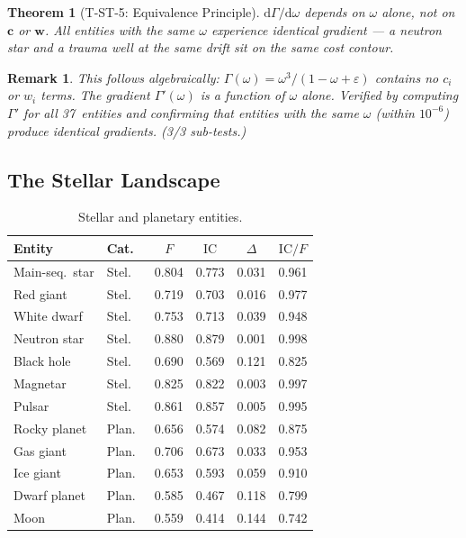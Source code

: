 \documentclass[
  aps,
  prd,
  twocolumn,
  superscriptaddress,
  nofootinbib,
  floatfix
]{revtex4-2}
\newtheorem{theorem}{Theorem}
\newtheorem{remark}{Remark}
\newcommand{\Gam}{\Gamma}
\newcommand{\eps}{\varepsilon}
\newcommand{\dd}{\mathrm{d}}
\newcommand{\tvec}{\mathbf{c}}
\newcommand{\wvec}{\mathbf{w}}
\newcommand{\IC}{\mathrm{IC}}
\begin{document}
\begin{theorem}[T-ST-5: Equivalence Principle]\label{thm:T5}
$\dd\Gam/\dd\omega$ depends on $\omega$ alone, not on
$\tvec$ or $\wvec$.  All entities with the same $\omega$
experience identical gradient --- a neutron star and a
trauma well at the same drift sit on the same cost contour.
\end{theorem}

\begin{remark}
This follows algebraically: $\Gam(\omega) = \omega^3/
(1 - \omega + \eps)$ contains no $c_i$ or $w_i$
terms.  The gradient $\Gam'(\omega)$ is a function of
$\omega$ alone.  Verified by computing $\Gam'$ for all
37~entities and confirming that entities with the same
$\omega$ (within $10^{-6}$) produce identical gradients.
(3/3 sub-tests.)
\end{remark}

\subsection{The Stellar Landscape}

\begin{table}[htbp]
\caption{\label{tab:stellar}Stellar and planetary entities.}
\begin{ruledtabular}
\begin{tabular}{llcccc}
Entity & Cat.\ & $F$ & $\IC$ & $\Delta$ & $\IC/F$ \\
\hline
Main-seq.\ star   & Stel.\ & 0.804 & 0.773 & 0.031 & 0.961 \\
Red giant          & Stel.\ & 0.719 & 0.703 & 0.016 & 0.977 \\
White dwarf        & Stel.\ & 0.753 & 0.713 & 0.039 & 0.948 \\
Neutron star       & Stel.\ & 0.880 & 0.879 & 0.001 & 0.998 \\
Black hole         & Stel.\ & 0.690 & 0.569 & 0.121 & 0.825 \\
Magnetar           & Stel.\ & 0.825 & 0.822 & 0.003 & 0.997 \\
Pulsar             & Stel.\ & 0.861 & 0.857 & 0.005 & 0.995 \\
\hline
Rocky planet       & Plan.\ & 0.656 & 0.574 & 0.082 & 0.875 \\
Gas giant          & Plan.\ & 0.706 & 0.673 & 0.033 & 0.953 \\
Ice giant          & Plan.\ & 0.653 & 0.593 & 0.059 & 0.910 \\
Dwarf planet       & Plan.\ & 0.585 & 0.467 & 0.118 & 0.799 \\
Moon               & Plan.\ & 0.559 & 0.414 & 0.144 & 0.742 \\
\end{tabular}
\end{ruledtabular}
\end{table}
\end{document}

